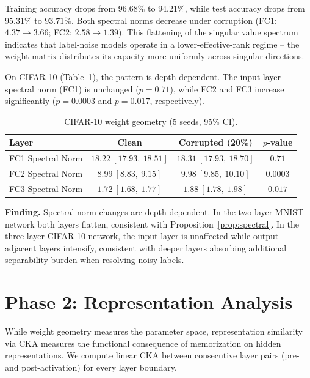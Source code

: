 \documentclass{article}
\begin{document}
Training accuracy drops from $96.68\%$ to $94.21\%$, while test accuracy drops from $95.31\%$ to $93.71\%$. Both spectral norms decrease under corruption (FC1: $4.37\to3.66$; FC2: $2.58\to1.39$). This flattening of the singular value spectrum indicates that label-noise models operate in a lower-effective-rank regime -- the weight matrix distributes its capacity more uniformly across singular directions.

On CIFAR-10 (Table~\ref{tab:spectral_cifar}), the pattern is depth-dependent. The input-layer spectral norm (FC1) is unchanged ($p=0.71$), while FC2 and FC3 increase significantly ($p=0.0003$ and $p=0.017$, respectively).

\begin{table}[t]
  \centering
  \caption{CIFAR-10 weight geometry (5 seeds, 95\% CI).}
  \label{tab:spectral_cifar}
  \begin{tabular}{lccc}
    \toprule
    Layer & Clean & Corrupted (20\%) & $p$-value \\
    \midrule
    FC1 Spectral Norm & $18.22\ [17.93,\ 18.51]$ & $18.31\ [17.93,\ 18.70]$ & $0.71$ \\
    FC2 Spectral Norm & $8.99\ [8.83,\ 9.15]$ & $9.98\ [9.85,\ 10.10]$ & $0.0003$ \\
    FC3 Spectral Norm & $1.72\ [1.68,\ 1.77]$ & $1.88\ [1.78,\ 1.98]$ & $0.017$ \\
    \bottomrule
  \end{tabular}
\end{table}

\textbf{Finding.} Spectral norm changes are depth-dependent. In the two-layer MNIST network both layers flatten, consistent with Proposition~\ref{prop:spectral}. In the three-layer CIFAR-10 network, the input layer is unaffected while output-adjacent layers intensify, consistent with deeper layers absorbing additional separability burden when resolving noisy labels.

\section{Phase 2: Representation Analysis}
\label{sec:phase2}

While weight geometry measures the parameter space, representation similarity via CKA measures the functional consequence of memorization on hidden representations. We compute linear CKA between consecutive layer pairs (pre- and post-activation) for every layer boundary.
\end{document}

